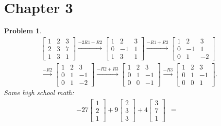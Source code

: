 \documentclass{article}
\theoremstyle{pprop}
\newtheorem{problem}{Problem}[section]
\begin{document}
\section*{Chapter 3}
\setcounter{section}{3}
\begin{problem}
\begin{align*}
& \left[\begin{matrix}1 & 2 & 3\\2 & 3 & 7\\1 & 3 & 1\end{matrix}\right] \xrightarrow{-2R1+R2}
\left[\begin{matrix}1 & 2 & 3\\0 & -1 & 1\\1 & 3 & 1\end{matrix}\right] \xrightarrow{-R1+R3}
\left[\begin{matrix}1 & 2 & 3\\0 & -1 & 1\\0 & 1 & -2\end{matrix}\right] \\
& \xrightarrow{-R2}
\left[\begin{matrix}1 & 2 & 3\\0 & 1 & -1\\0 & 1 & -2\end{matrix}\right]
\xrightarrow{-R2+R3}
\left[\begin{matrix}1 & 2 & 3\\0 & 1 & -1\\0 & 0 & -1\end{matrix}\right]
\xrightarrow{-R3}
\left[\begin{matrix}1 & 2 & 3\\0 & 1 & -1\\0 & 0 & 1\end{matrix}\right].  
\end{align*}  
Some high school math:
\begin{align*}
-27 \begin{bmatrix} 1 \\ 2 \\ 1 \end{bmatrix}
+
9 \begin{bmatrix} 2 \\ 3 \\ 3 \end{bmatrix}
+
4 \begin{bmatrix} 3 \\ 7 \\ 1 \end{bmatrix}&=

\end{align*}
\end{problem}
\end{document}
